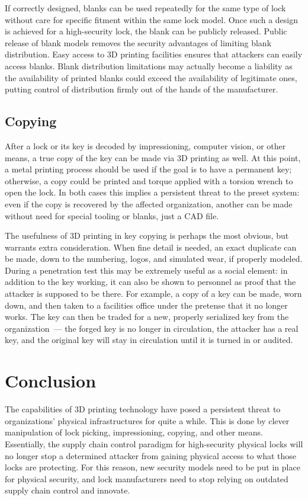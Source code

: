 \documentclass{acm_proc_article-sp}
\begin{document}
If correctly designed, blanks can be used repeatedly for the same type of lock without care for specific fitment within the same lock model. Once such a design is achieved for a high-security lock, the blank can be publicly released. Public release of blank models removes the security advantages of limiting blank distribution. Easy access to 3D printing facilities ensures that attackers can easily access blanks. Blank distribution limitations may actually become a liability as the availability of printed blanks could exceed the availability of legitimate ones, putting control of distribution firmly out of the hands of the manufacturer.

\subsection{Copying}
After a lock or its key is decoded by impressioning, computer vision, or other means, a true copy of the key can be made via 3D printing as well. At this point, a metal printing process should be used if the goal is to have a permanent key; otherwise, a copy could be printed and torque applied with a torsion wrench to open the lock. In both cases this implies a persistent threat to the preset system: even if the copy is recovered by the affected organization, another can be made without need for special tooling or blanks, just a CAD file.

The usefulness of 3D printing in key copying is perhaps the most obvious, but warrants extra consideration. When fine detail is needed, an exact duplicate can be made, down to the numbering, logos, and simulated wear, if properly modeled. During a penetration test this may be extremely useful as a social element: in addition to the key working, it can also be shown to personnel as proof that the attacker is supposed to be there. For example, a copy of a key can be made, worn down, and then taken to a facilities office under the pretense that it no longer works. The key can then be traded for a new, properly serialized key from the organization~--- the forged key is no longer in circulation, the attacker has a real key, and the original key will stay in circulation until it is turned in or audited.

\section{Conclusion}
The capabilities of 3D printing technology have posed a persistent threat to organizations' physical infrastructures for quite a while. This is done by clever manipulation of lock picking, impressioning, copying, and other means. Essentially, the supply chain control paradigm for high-security physical locks will no longer stop a determined attacker from gaining physical access to what those locks are protecting. For this reason, new security models need to be put in place for physical security, and lock manufacturers need to stop relying on outdated supply chain control and innovate.
\end{document}

